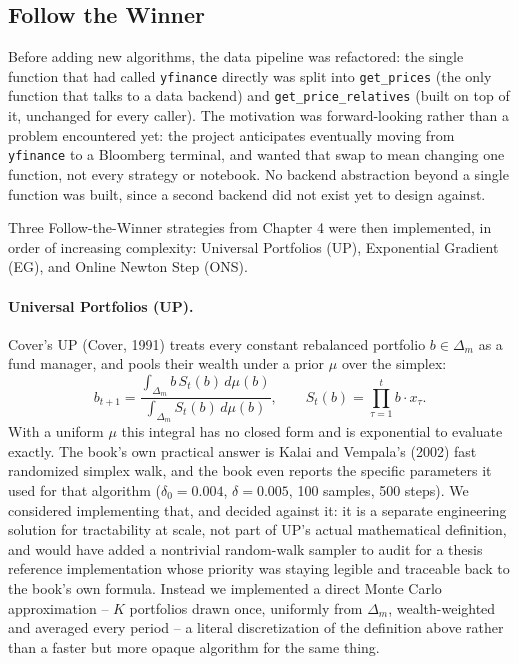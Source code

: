 \documentclass[11pt]{article}
\begin{document}
\subsection{Follow the Winner}
\label{sec:ftw}

Before adding new algorithms, the data pipeline was refactored: the single
function that had called \texttt{yfinance} directly was split into
\texttt{get\_prices} (the only function that talks to a data backend) and
\texttt{get\_price\_relatives} (built on top of it, unchanged for every
caller). The motivation was forward-looking rather than a problem
encountered yet: the project anticipates eventually moving from
\texttt{yfinance} to a Bloomberg terminal, and wanted that swap to mean
changing one function, not every strategy or notebook. No backend
abstraction beyond a single function was built, since a second backend did
not exist yet to design against.

Three Follow-the-Winner strategies from Chapter 4 were then implemented,
in order of increasing complexity: Universal Portfolios (UP), Exponential
Gradient (EG), and Online Newton Step (ONS).

\paragraph{Universal Portfolios (UP).}
Cover's UP (Cover, 1991) treats every constant rebalanced portfolio
$b \in \Delta_m$ as a fund manager, and pools their wealth under a prior
$\mu$ over the simplex:
\[
    b_{t+1} = \frac{\int_{\Delta_m} b \, S_t(b) \, d\mu(b)}
                   {\int_{\Delta_m} S_t(b) \, d\mu(b)}, \qquad
    S_t(b) = \prod_{\tau=1}^t b \cdot x_\tau.
\]
With a uniform $\mu$ this integral has no closed form and is exponential
to evaluate exactly. The book's own practical answer is Kalai and
Vempala's (2002) fast randomized simplex walk, and the book even reports
the specific parameters it used for that algorithm
($\delta_0 = 0.004$, $\delta = 0.005$, 100 samples, 500 steps). We
considered implementing that, and decided against it: it is a separate
engineering solution for tractability at scale, not part of UP's actual
mathematical definition, and would have added a nontrivial random-walk
sampler to audit for a thesis reference implementation whose priority was
staying legible and traceable back to the book's own formula. Instead we
implemented a direct Monte Carlo approximation -- $K$ portfolios drawn
once, uniformly from $\Delta_m$, wealth-weighted and averaged every period
-- a literal discretization of the definition above rather than a faster
but more opaque algorithm for the same thing.
\end{document}

